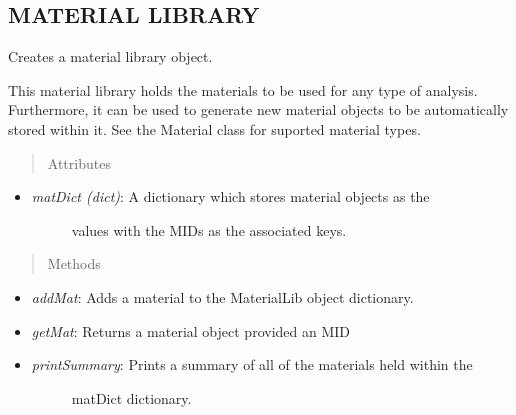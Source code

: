 \documentclass[letterpaper,10pt,english]{sphinxmanual}
\begin{document}
\subsection{MATERIAL LIBRARY}
\label{structures:material-library}

\begin{fulllineitems}
\label{structures:AeroComBAT.Structures.MaterialLib}
Creates a material library object.

This material library holds the materials to be used for any type of
analysis. Furthermore, it can be used to generate new material objects
to be automatically stored within it. See the Material class for suported
material types.
\begin{quote}\begin{description}
\item[{Attributes}] \leavevmode
\end{description}\end{quote}
\begin{itemize}
\item {} \begin{description}
\item[{\emph{matDict (dict)}: A dictionary which stores material objects as the}] \leavevmode
values with the MIDs as the associated keys.

\end{description}

\end{itemize}
\begin{quote}\begin{description}
\item[{Methods}] \leavevmode
\end{description}\end{quote}
\begin{itemize}
\item {} 
\emph{addMat}: Adds a material to the MaterialLib object dictionary.

\item {} 
\emph{getMat}: Returns a material object provided an MID

\item {} \begin{description}
\item[{\emph{printSummary}: Prints a summary of all of the materials held within the}] \leavevmode
matDict dictionary.


\end{description}
\end{itemize}
\end{fulllineitems}
\end{document}
